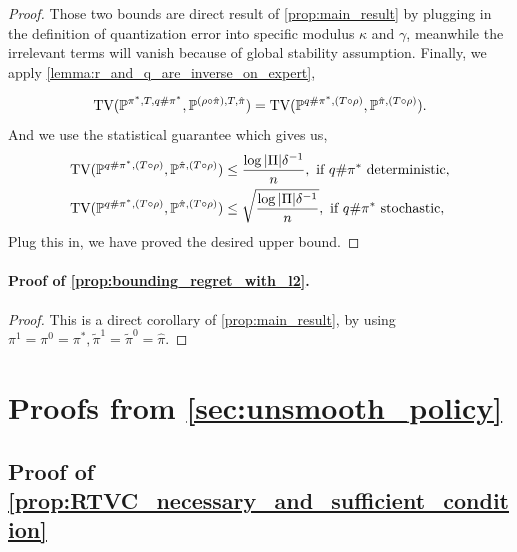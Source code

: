 \documentclass{article}
\let\oldparagraph\paragraph
\renewcommand{\paragraph}[1]{\oldparagraph{#1.}}
\begin{document}
\begin{proof}
Those two bounds are direct result of \cref{prop:main_result} by plugging in the definition of quantization error into specific modulus $\kappa$ and $\gamma$, meanwhile the irrelevant terms will vanish because of global stability assumption. Finally, we apply \cref{lemma:r_and_q_are_inverse_on_expert},










\begin{equation*}
    \textnormal{TV}(\mathbb P^{\pi^*, T, q\#\pi^*},\mathbb P^{(\rho\circ \hat \pi), T, \hat \pi} )  = \textnormal{TV}(\mathbb P^{q\#\pi^*, (T\circ \rho)},\mathbb P^{\hat \pi, (T\circ \rho)} ) .
\end{equation*}
And we use the statistical guarantee which gives us,
\begin{align*}
    &\textnormal{TV}(\mathbb P^{q\#\pi^*, (T\circ \rho)},\mathbb P^{\hat \pi, (T\circ \rho)} ) \leq \frac{\log |\Pi|\delta^{-1}}{n}, \textnormal{ if } q\#\pi^* \textnormal{ deterministic},\\
    &\textnormal{TV}(\mathbb P^{q\#\pi^*, (T\circ \rho)},\mathbb P^{\hat \pi, (T\circ \rho)} ) \leq \sqrt{\frac{\log |\Pi|\delta^{-1}}{n}}, \textnormal{ if } q\#\pi^* \textnormal{ stochastic},
\end{align*}
Plug this in, we have proved the desired upper bound.
\end{proof}





\paragraph{Proof of \cref{prop:bounding_regret_with_l2}}


\begin{proof}
    This is a direct corollary of \cref{prop:main_result}, by using $\pi^1=\pi^0=\pi^*, \tilde \pi^1=\tilde \pi^0=\hat \pi$. 
\end{proof} 

\section{Proofs from \texorpdfstring{\cref{sec:unsmooth_policy}}{Section 4}}

\subsection{Proof of \texorpdfstring{\cref{prop:RTVC_necessary_and_sufficient_condition}}{Proposition 5}}
\end{document}
